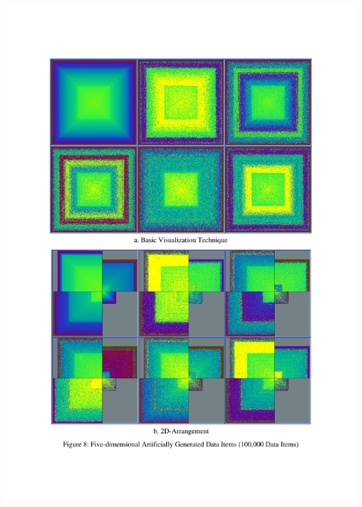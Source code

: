 \begin{itemize}
{    \includegraphics [width=\linewidth]{figures/pixel_keim_axes.pdf}
    \label{fig:pixel-axes}
}
\hfill
\hspace{0.2cm}
\parbox [h]{0.3\textwidth }{
}
\end{itemize}
